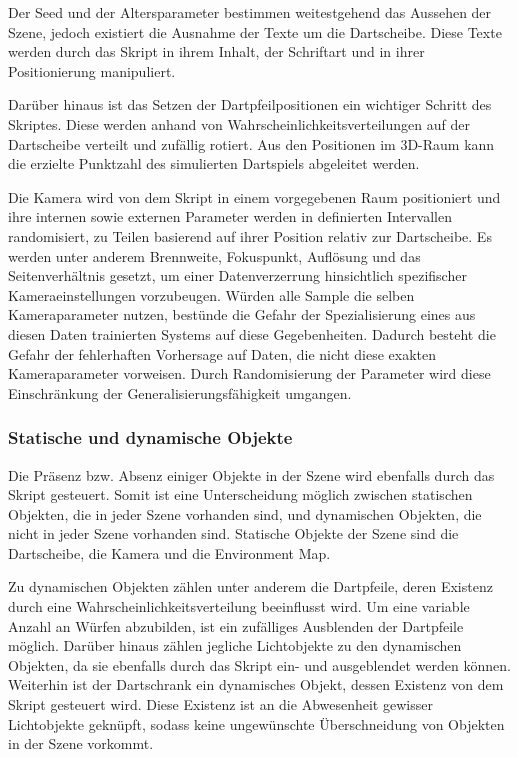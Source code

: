 Der Seed und der Altersparameter bestimmen weitestgehend das Aussehen der Szene, jedoch existiert die Ausnahme der Texte um die Dartscheibe. Diese Texte werden durch das Skript in ihrem Inhalt, der Schriftart und in ihrer Positionierung manipuliert.

Darüber hinaus ist das Setzen der Dartpfeilpositionen ein wichtiger Schritt des Skriptes. Diese werden anhand von Wahrscheinlichkeitsverteilungen auf der Dartscheibe verteilt und zufällig rotiert. Aus den Positionen im 3D-Raum kann die erzielte Punktzahl des simulierten Dartspiels abgeleitet werden.

Die Kamera wird von dem Skript in einem vorgegebenen Raum positioniert und ihre internen sowie externen Parameter werden in definierten Intervallen randomisiert, zu Teilen basierend auf ihrer Position relativ zur Dartscheibe. Es werden unter anderem Brennweite, Fokuspunkt, Auflösung und das Seitenverhältnis gesetzt, um einer Datenverzerrung hinsichtlich spezifischer Kameraeinstellungen vorzubeugen. Würden alle Sample die selben Kameraparameter nutzen, bestünde die Gefahr der Spezialisierung eines aus diesen Daten trainierten Systems auf diese Gegebenheiten. Dadurch besteht die Gefahr der fehlerhaften Vorhersage auf Daten, die nicht diese exakten Kameraparameter vorweisen. Durch Randomisierung der Parameter wird diese Einschränkung der Generalisierungsfähigkeit umgangen.

\subsubsection{Statische und dynamische Objekte}

Die Präsenz bzw. Absenz einiger Objekte in der Szene wird ebenfalls durch das Skript gesteuert. Somit ist eine Unterscheidung möglich zwischen statischen Objekten, die in jeder Szene vorhanden sind, und dynamischen Objekten, die nicht in jeder Szene vorhanden sind. Statische Objekte der Szene sind die Dartscheibe, die Kamera und die Environment Map.

Zu dynamischen Objekten zählen unter anderem die Dartpfeile, deren Existenz durch eine Wahrscheinlichkeitsverteilung beeinflusst wird. Um eine variable Anzahl an Würfen abzubilden, ist ein zufälliges Ausblenden der Dartpfeile möglich. Darüber hinaus zählen jegliche Lichtobjekte zu den dynamischen Objekten, da sie ebenfalls durch das Skript ein- und ausgeblendet werden können. Weiterhin ist der Dartschrank ein dynamisches Objekt, dessen Existenz von dem Skript gesteuert wird. Diese Existenz ist an die Abwesenheit gewisser Lichtobjekte geknüpft, sodass keine ungewünschte Überschneidung von Objekten in der Szene vorkommt.

